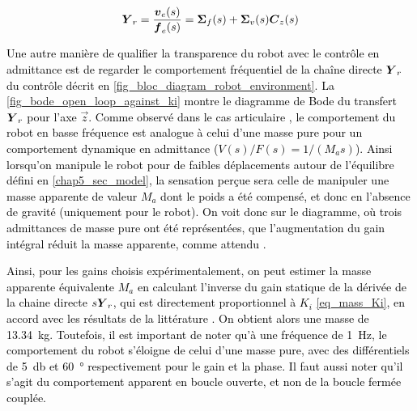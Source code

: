 


\begin{equation}
	\matr{Y}_r = \frac{\vect{v}_e(s)}{\vect{f}_{e}(s)} = \matr{\Sigma}_f(s) + \matr{\Sigma}_v(s) \matr{C}_z(s)
\end{equation}

\textcolor{black}{Une autre manière de qualifier la transparence du robot avec le contrôle en admittance est de regarder le comportement fréquentiel de la chaîne directe $\matr{Y}_r$ du contrôle décrit en \cref{fig_bloc_diagram_robot_environment}. La \cref{fig_bode_open_loop_against_ki} montre le diagramme de Bode du transfert $\matr{Y}_r$ pour l'axe $\vec{z}$. Comme observé dans le cas articulaire \parencite{lamy_achieving_2009}, le comportement du robot en basse fréquence est analogue à celui d'une masse pure pour un comportement dynamique en admittance ($V(s)/F(s)=1/(M_as)$). Ainsi lorsqu'on manipule le robot pour de faibles déplacements autour de l'équilibre défini en \cref{chap5_sec_model}, la sensation perçue sera celle de manipuler une masse apparente de valeur $M_a$ dont le poids a été compensé, et donc en l'absence de gravité (uniquement pour le robot). On voit donc sur le diagramme, où trois admittances de masse pure ont été représentées, que l'augmentation du gain intégral réduit la masse apparente, comme attendu \parencite{newman_stability_1992,lamy_achieving_2009}.}



\textcolor{black}{Ainsi, pour les gains choisis expérimentalement, on peut estimer la masse apparente équivalente $M_a$ en calculant l'inverse du gain statique de la dérivée de la chaine directe $s\matr{Y}_r$, qui est directement proportionnel à $K_i$ \cref{eq_mass_Ki}, en accord avec les résultats de la littérature \parencite{lamy_conception_2011}. On obtient alors une masse de \SI{13.34}{\kilogram}. Toutefois, il est important de noter qu'à une fréquence de \SI{1}{\hertz}, le comportement du robot s'éloigne de celui d'une masse pure, avec des différentiels de \SI{5}{\decibel} et \SI{60}{\degree} respectivement pour le gain et la phase. Il faut aussi noter qu'il s'agit du comportement apparent en boucle ouverte, et non de la boucle fermée couplée.}

